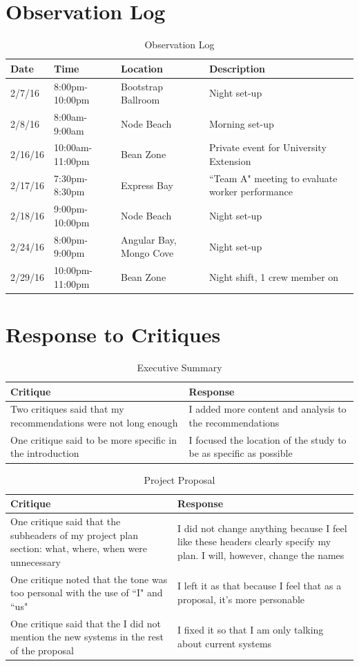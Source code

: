 \documentclass[letterpaper, 12pt]{report}
\begin{document}
\section{Observation Log}
\begin{table}[ht]
	\caption{Observation Log}
	\begin{tabular}{l l l p{5.75cm}}
		\hline \hline
		Date & Time & Location & Description\\
		\hline
		2/7/16 & 8:00pm-10:00pm & Bootstrap Ballroom & Night set-up\\
		2/8/16 & 8:00am-9:00am & Node Beach & Morning set-up\\
		2/16/16 & 10:00am-11:00pm & Bean Zone & Private event for University Extension\\
		2/17/16 & 7:30pm-8:30pm & Express Bay & ``Team A" meeting to evaluate worker performance\\
		2/18/16 & 9:00pm-10:00pm & Node Beach & Night set-up\\
		2/24/16 & 8:00pm-9:00pm & Angular Bay, Mongo Cove & Night set-up\\
		2/29/16 & 10:00pm-11:00pm & Bean Zone & Night shift, 1 crew member on\\
		\hline
	\end{tabular}
\end{table}

\section{Response to Critiques}
\begin{table}[ht]
	\caption{Executive Summary}
	\begin{tabular}{p{8cm} p{8cm}}
		\hline \hline
		Critique & Response\\
		\hline
		Two critiques said that my recommendations were not long enough & I added more content and analysis to the recommendations\\
		One critique said to be more specific in the introduction & I focused the location of the study to be as specific as possible \\
		\hline
	\end{tabular}
\end{table}

\begin{table}[ht]
	\caption{Project Proposal}
	\begin{tabular}{p{8cm} p{8cm}}
		\hline \hline
		Critique & Response\\
		\hline
		One critique said that the subheaders of my project plan section: what, where, when were unnecessary & I did not change anything because I feel like these headers clearly specify my plan. I will, however, change the names\\
		One critique noted that the tone was too personal with the use of ``I" and ``us" & I left it as that because I feel that as a proposal, it's more personable\\
		One critique said that the I did not mention the new systems in the rest of the proposal& I fixed it so that I am only talking about current systems\\
		\hline
	\end{tabular}
\end{table}
\end{document}
